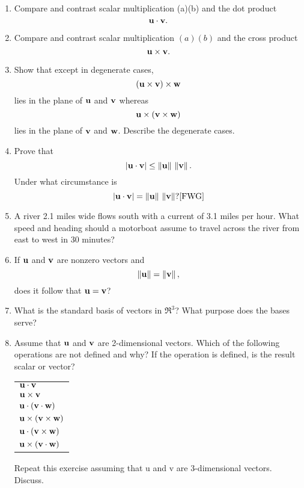 \begin{enumerate}
 \item Compare and contrast scalar multiplication (a)(b) and the dot product $$\bf{u} \cdot \bf{v}.$$
 \item Compare and contrast scalar multiplication $(a)(b)$ and the cross product $$\bf{u} \times \bf{v}.$$
 \item Show that except in degenerate cases, $$\left( {\bf{u} \times \bf{v}} \right) \times \bf{w}$$ lies in the plane of $\bf{u}$ and $\bf{v}$ whereas $$\bf{u} \times \left( {\bf{v} \times \bf{w}} \right)$$ lies in the plane of $\bf{v}$ and $\bf{w}$.  Describe the degenerate cases.  \cite{FWG}
 \item Prove that $$\left| {\bf{u} \cdot \bf{v}} \right| \le \left\| \bf{u} \right\|\,\left\| \bf{v} \right\|.$$ Under what circumstance is $$\left| {\bf{u} \cdot \bf{v}} \right| = \left\| \bf{u} \right\|\,\left\| \bf{v} \right\|? \cite{FWG}$$  
 \item A river 2.1 miles wide flows south with a current of 3.1 miles per hour.  What speed and heading should a motorboat assume to travel across the river from east to west in 30 minutes?  \cite{SBS}
 \item If $\bf{u}$ and $\bf{v}$ are nonzero vectors and $$\left\| \bf{u} \right\| = \left\| \bf{v} \right\|,$$ does it follow that $\bf{u}=\bf{v}$?  \cite{SBS}
 \item What is the standard basis of vectors in ${\Re}^3 $?  What purpose does the bases serve?
 
 \item Assume that $\bf{u}$ and $\bf{v}$ are 2-dimensional vectors.  Which of the following operations are not defined and why?  If the operation is defined, is the result scalar or vector? 
 
 \begin{center}
 \begin{tabular}{l}
 $\bf{u} \cdot \bf{v}$\\ 
 $\bf{u} \times \bf{v}$\\
 $\bf{u} \cdot \left( {\bf{v} \cdot \bf{w}} \right)$\\ 
 $\bf{u} \times \left( {\bf{v} \times \bf{w}} \right)$\\ 
 $\bf{u} \cdot \left( {\bf{v} \times \bf{w}} \right)$\\
 $\bf{u} \times \left( {\bf{v} \cdot \bf{w}} \right)$\\ 
 \end{tabular} 
 \end{center}
 
 Repeat this exercise assuming that u and v are 3-dimensional vectors.  Discuss.
 

\end{enumerate}
